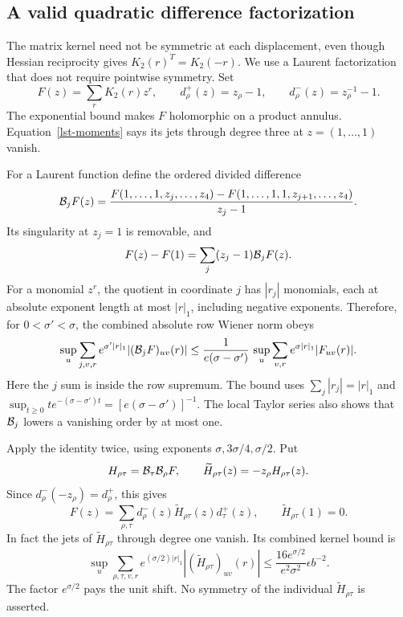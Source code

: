 \subsection{A valid quadratic difference factorization}
\label{lst-quadratic-section}

The matrix kernel need not be symmetric at each displacement,
even though Hessian reciprocity gives
\(K_2(r)^T=K_2(-r)\). We use a Laurent factorization that
does not require pointwise symmetry. Set
\[
 F(z)=\sum_r K_2(r)z^r,\qquad
 d_\rho^+(z)=z_\rho-1,\qquad
 d_\rho^-(z)=z_\rho^{-1}-1 .
\]
The exponential bound makes \(F\) holomorphic on a product
annulus. Equation~\eqref{lst-moments} says its jets through
degree three at \(z=(1,\ldots,1)\) vanish.

For a Laurent function define the ordered divided difference
\begin{equation}
 {\cal B}_jF(z)=
 \frac{F(1,\ldots,1,z_j,\ldots,z_4)
        -F(1,\ldots,1,1,z_{j+1},\ldots,z_4)}
      {z_j-1}.
 \label{lst-divided-difference}
\end{equation}
Its singularity at \(z_j=1\) is removable, and
\[
 F(z)-F(1)=\sum_j(z_j-1){\cal B}_jF(z).
\]
For a monomial \(z^r\), the quotient in coordinate \(j\)
has \(|r_j|\) monomials, each at absolute exponent length
at most \(|r|_1\), including negative exponents. Therefore,
for \(0<\sigma'<\sigma\), the combined absolute row Wiener
norm obeys
\begin{equation}
 \sup_u\sum_{j,v,r}e^{\sigma'|r|_1}
       |({\cal B}_jF)_{uv}(r)|
 \le\frac1{e(\sigma-\sigma')}\,
             \sup_u\sum_{v,r}e^{\sigma|r|_1}|F_{uv}(r)|.
 \label{lst-Wiener-quotient}
\end{equation}
Here the \(j\) sum is inside the row supremum. The bound
uses \(\sum_j|r_j|=|r|_1\) and
\(\sup_{t\ge0}t e^{-(\sigma-\sigma')t}
 =[e(\sigma-\sigma')]^{-1}\).
The local Taylor series also shows that
\({\cal B}_j\) lowers a vanishing order by at most one.

Apply the identity twice, using exponents
\(\sigma,3\sigma/4,\sigma/2\). Put
\[
 H_{\rho\tau}={\cal B}_\tau{\cal B}_\rho F,\qquad
 \widetilde H_{\rho\tau}(z)=-z_\rho H_{\rho\tau}(z).
\]
Since \(d_\rho^-(-z_\rho)=d_\rho^+\), this gives
\begin{equation}
 F(z)=\sum_{\rho,\tau}
       d_\rho^-(z)\widetilde H_{\rho\tau}(z)d_\tau^+(z),
 \qquad \widetilde H_{\rho\tau}(1)=0.
 \label{lst-factorization}
\end{equation}
In fact the jets of \(\widetilde H_{\rho\tau}\) through
degree one vanish. Its combined kernel bound is
\begin{equation}
 \sup_u\sum_{\rho,\tau,v,r}
     e^{(\sigma/2)|r|_1}
           |(\widetilde H_{\rho\tau})_{uv}(r)|
 \le \frac{16e^{\sigma/2}}{e^2\sigma^2}
                           \epsilon b^{-2}.
 \label{lst-H-bound}
\end{equation}
The factor \(e^{\sigma/2}\) pays the unit shift. No symmetry
of the individual \(\widetilde H_{\rho\tau}\) is asserted.

